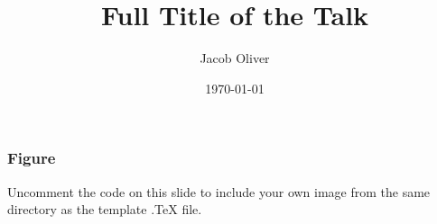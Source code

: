 \documentclass{beamer}
\title[Short title]{Full Title of the Talk} %
\author{Jacob Oliver} %
\institute[QMUL] %
	{
		Queen Mary, University of London \\ %
		\medskip
		\textit{j.m.j.oliver@qmul.ac.uk} %
	}
\date{\today} %
\begin{document}
		
		\begin{frame}
			\titlepage %
		\end{frame}
		
		\begin{frame}
			\frametitle{Figure}
			Uncomment the code on this slide to include your own image from the same directory as the template .TeX file.
		\end{frame}
		
	
\end{document}
